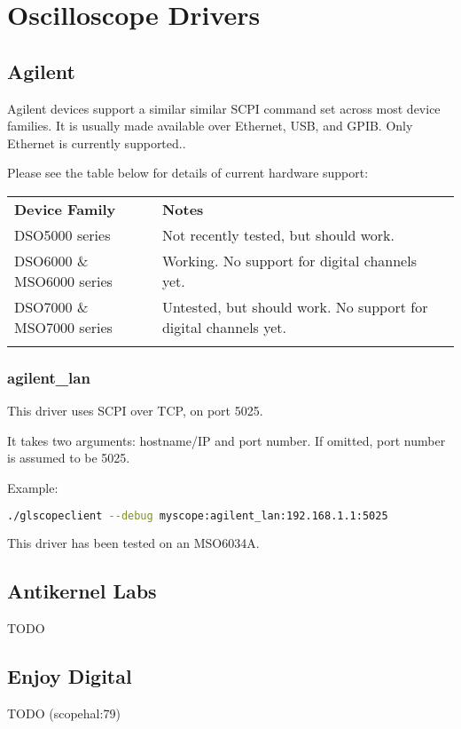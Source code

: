 \section{Oscilloscope Drivers}
\label{sec:drivers}

\subsection{Agilent}

Agilent devices support a similar similar SCPI command set across most device families. It is usually made available over Ethernet, USB, and GPIB. Only Ethernet is currently supported..

Please see the table below for details of current hardware support:

\begin{tabularx}{16cm}{llX}
\thickhline
\textbf{Device Family} & \textbf{Notes} \\
\thickhline
DSO5000 series & Not recently tested, but should work.\\
\thickhline
DSO6000 \& MSO6000 series & Working. No support for digital channels yet.\\
\thickhline
DSO7000 \& MSO7000 series & Untested, but should work. No support for digital channels yet.\\
\thickhline
\end{tabularx}

\subsubsection{agilent\_lan}

This driver uses SCPI over TCP, on port 5025.

It takes two arguments: hostname/IP and port number. If omitted, port number is assumed to be 5025.

Example:
\begin{lstlisting}[language=sh]
./glscopeclient --debug myscope:agilent_lan:192.168.1.1:5025
\end{lstlisting}

This driver has been tested on an MSO6034A.

\subsection{Antikernel Labs}
TODO

\subsection{Enjoy Digital}
TODO (scopehal:79)

